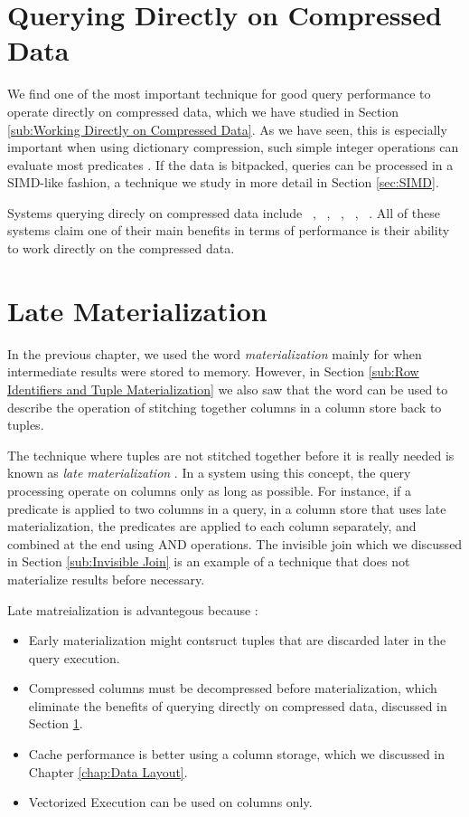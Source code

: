 \section{Querying Directly on Compressed Data}
\label{sec:Querying Directly on Compressed Data}
We find one of the most important technique for good query performance to operate directly on compressed data, which we have studied in Section \ref{sub:Working Directly on Compressed Data}. As we have seen, this is especially important when using dictionary compression, such simple integer operations can evaluate most predicates \cite{Abadi2008-dd}. If the data is bitpacked, queries can be processed in a SIMD-like fashion, a technique we study in more detail in Section \ref{sec:SIMD}.

Systems querying direcly on compressed data include \cstore~\cite{Stonebraker2005-qz}, \ibm~\cite{Raman2013-em}, \mssql~\cite{Larson2013-mc}, \blink~\cite{Johnson2008-cp}, \sapnw~\cite{Lemke2010-is}. All of these systems claim one of their main benefits in terms of performance is their ability to work directly on the compressed data.

\section{Late Materialization}
\label{sec:Late Materialization}
In the previous chapter, we used the word \textit{materialization} mainly for when intermediate results were stored to memory. However, in Section \ref{sub:Row Identifiers and Tuple Materialization} we also saw that the word can be used to describe the operation of stitching together columns in a column store back to tuples. 

The technique where tuples are not stitched together before it is really needed is known as \textit{late materialization} \cite{Abadi2008-dd}. In a system using this concept, the query processing operate on columns only as long as possible. For instance, if a predicate is applied to two columns in a query, in a column store that uses late materialization, the predicates  are applied to each column separately, and combined at the end using AND operations. The invisible join which we discussed in Section \ref{sub:Invisible Join} is an example of a technique that does not materialize results before necessary.

Late matreialization is advantegous because \cite{Abadi2008-dd}:
\begin{itemize}
  \item Early materialization might contsruct tuples that are discarded later in the query execution.
  \item Compressed columns must be decompressed before materialization, which eliminate the benefits of querying directly on compressed data, discussed in Section \ref{sec:Querying Directly on Compressed Data}.
  \item Cache performance is better using a column storage, which we discussed in Chapter \ref{chap:Data Layout}.
  \item Vectorized Execution can be used on columns only.
\end{itemize}

